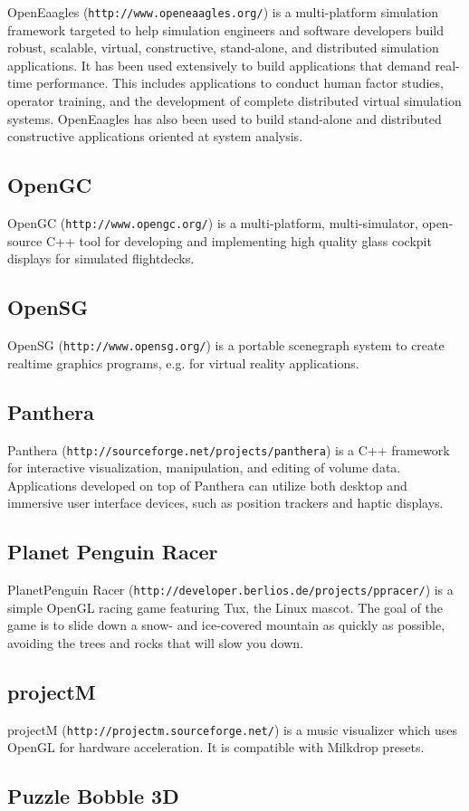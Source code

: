 OpenEaagles ({\tt http://www.openeaagles.org/}) is a multi-platform simulation framework targeted to help simulation engineers and software developers build robust, scalable, virtual, constructive, stand-alone, and distributed simulation applications. It has been used extensively to build applications that demand real-time performance. This includes applications to conduct human factor studies, operator training, and the development of complete distributed virtual simulation systems. OpenEaagles has also been used to build stand-alone and distributed constructive applications oriented at system analysis.\subsection{OpenGC}\label{ftgl-projects_opengc}
OpenGC ({\tt http://www.opengc.org/}) is a multi-platform, multi-simulator, open-source C++ tool for developing and implementing high quality glass cockpit displays for simulated flightdecks.\subsection{OpenSG}\label{ftgl-projects_opensg}
OpenSG ({\tt http://www.opensg.org/}) is a portable scenegraph system to create realtime graphics programs, e.g. for virtual reality applications.\subsection{Panthera}\label{ftgl-projects_panthera}
Panthera ({\tt http://sourceforge.net/projects/panthera}) is a C++ framework for interactive visualization, manipulation, and editing of volume data. Applications developed on top of Panthera can utilize both desktop and immersive user interface devices, such as position trackers and haptic displays.\subsection{Planet Penguin Racer}\label{ftgl-projects_ppracer}
PlanetPenguin Racer ({\tt http://developer.berlios.de/projects/ppracer/}) is a simple OpenGL racing game featuring Tux, the Linux mascot. The goal of the game is to slide down a snow- and ice-covered mountain as quickly as possible, avoiding the trees and rocks that will slow you down.\subsection{projectM}\label{ftgl-projects_projectm}
projectM ({\tt http://projectm.sourceforge.net/}) is a music visualizer which uses OpenGL for hardware acceleration. It is compatible with Milkdrop presets.\subsection{Puzzle Bobble 3D}\label{ftgl-projects_puzzle}
